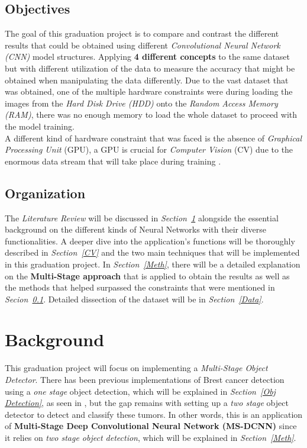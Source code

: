 \documentclass[12pt]{extarticle}
\begin{document}
	\subsection{Objectives}\label{Obj}
	The goal of this graduation project is to compare and contrast the different results that could be obtained using different \emph{Convolutional Neural Network (CNN)} model structures. Applying \textbf{4 different concepts} to the same dataset but with different utilization of the data to measure the accuracy that might be obtained when manipulating the data differently. Due to the vast dataset that was obtained, one of the multiple hardware constraints were during loading the images from the \emph{Hard Disk Drive (HDD)} onto the \emph{Random Access Memory (RAM)}, there was no enough memory to load the whole dataset to proceed with the model training. \\[5mm]
	A different kind of hardware constraint that was faced is the absence of \emph{Graphical Processing Unit} (GPU), a GPU is crucial for \emph{Computer Vision} (CV) due to the enormous data stream that will take place during training \cite{GPU}.
	\subsection{Organization}\label{Org}
	The \emph{Literature Review} will be discussed in \emph{Section~\ref{Lit. Rev.}} alongside the essential background on the different kinds of Neural Networks with their diverse functionalities. A deeper dive into the application's functions will be thoroughly described in \emph{Section~\ref{CV}} and the two main techniques that will be implemented in this graduation project. In \emph{Section~\ref{Meth}}, there will be a detailed explanation on the \textbf{Multi-Stage approach} that is applied to obtain the results as well as the methods that helped surpassed the constraints that were mentioned in \emph{Secion~\ref{Obj}}. Detailed dissection of the dataset will be in \emph{Section~\ref{Data}}.
	\newpage
	\section{Background}\label{Lit. Rev.}
	This graduation project will focus on implementing a \emph{Multi-Stage Object Detector}. There has been previous implementations of Brest cancer detection using a \emph{one stage} object detection, which will be explained in \emph{Section~\ref{Obj Detection}}, as seen in \cite{one_shot}, but the gap remains with setting up a \emph{two stage} object detector to detect and classify these tumors. In other words, this is an application of \textbf{Multi-Stage Deep Convolutional Neural Network (MS-DCNN)} since it relies on \emph{two stage object detection}, which will be explained in \emph{Section~\ref{Meth}}.
\end{document}
